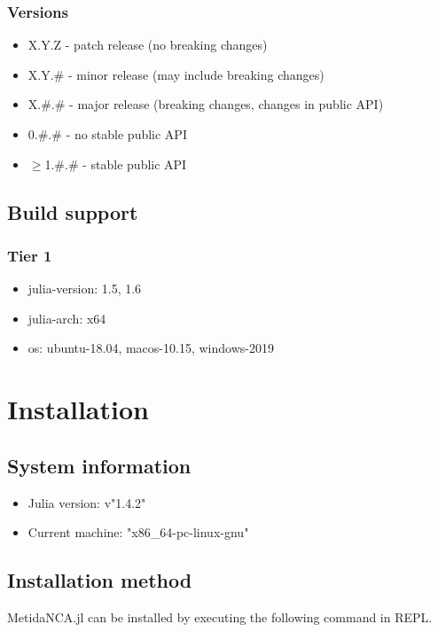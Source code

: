 \documentclass[12pt,a4paper]{article}
\begin{document}
\subsubsection{Versions}
\begin{itemize}
\item X.Y.Z - patch release (no breaking changes)


\item X.Y.\# - minor release (may include breaking changes)


\item X.\#.\# - major release (breaking changes, changes in public API)


\item 0.\#.\# - no stable public API


\item \ensuremath{\geq}1.\#.\# - stable public API

\end{itemize}
\subsection{Build support}
\subsubsection{Tier 1}
\begin{itemize}
\item julia-version: 1.5, 1.6


\item julia-arch: x64


\item os: ubuntu-18.04, macos-10.15, windows-2019

\end{itemize}
\section{Installation}
\subsection{System information}
\begin{itemize}
\item Julia version: v"1.4.2"


\item Current machine: "x86\_64-pc-linux-gnu"

\end{itemize}
\subsection{Installation method}
MetidaNCA.jl can be installed by executing the following command in REPL.
\end{document}
